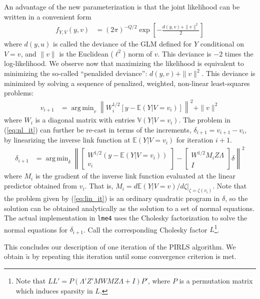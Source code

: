 \documentclass{article}
\newcommand{\bE}{\mathbb{E}}
\newcommand{\bV}{\mathbb{V}}
\DeclareMathOperator*{\argmin}{arg\,min}
\begin{document}
An advantage of the new parameterization is that the joint likelihood can be written in a convenient form
%
\begin{align}
    f_{Y,V}(y,v) &= (2\pi)^{-Q/2} \exp \left[- \frac{ d(y, v) + \| v \|^2}{2} \right] \label{eq:exp_dev}
\end{align}
where $d(y,u)$ is called the deviance of the GLM defined for $Y$ conditional on $V=v$, and $\| v \|$ is the Euclidean ($\ell^2$) norm of $v$. This deviance is $-2$ times the log-likelihood. We observe now that maximizing the likelihood is equivalent to minimizing the so-called ``penalided deviance'': $d(y, v) + \| v \|^2$. This deviance is minimized by solving a sequence of penalized, weighted, non-linear least-squares problems:
%
\begin{align}
    v_{i+1} &= \argmin_{v} \left\| W_i^{1/2} [y - \bE(Y|V=v_i)] \right\|^2 + \| v \|^2 \label{eq:nl_it}
\end{align}
%
where $W_i$ is a diagonal matrix with entries $\bV(Y | V=v_i)$. The problem in (\ref{eq:nl_it}) can further be re-cast in terms of the increments, $\delta_{i+1} = v_{i+1} - v_i$, by linearizing the inverse link function at $\bE(Y | V=v_i)$ for iteration $i+1$.
%
\begin{align}
    \delta_{i+1} &= \argmin_{\delta} \left\| \begin{bmatrix} W^{1/2} (y - \bE(Y | V = v_i)) \\ v_i \end{bmatrix} -
    \begin{bmatrix} W^{1/2}M_i Z \Lambda \\ I \end{bmatrix} \delta \right\|^2 \label{eq:lin_it}
\end{align}
%
where $M_i$ is the gradient of the inverse link function evaluated at the linear predictor obtained from $v_i$. That is, $M_i = \left. d \bE(Y | V=v) / d\zeta \right|_{\zeta = \zeta(v_i)}$. Note that the problem given by (\ref{eq:lin_it}) is an ordinary quadratic program in $\delta$, so the solution can be obtained analytically as the solution to a set of normal equations. The actual implementation in \texttt{lme4} uses the Cholesky factorization to solve the normal equations for $\delta_{i+1}$. Call the corresponding Cholesky factor $L$\footnote[3]{Note that $L L' = P(\Lambda' Z' M W M Z \Lambda + I)P'$, where $P$ is a permutation matrix which induces sparsity in $L$.}. 

This concludes our description of one iteration of the PIRLS algorithm. We obtain $\tilde{u}$ by repeating this iteration until some convergence criterion is met.
\end{document}
